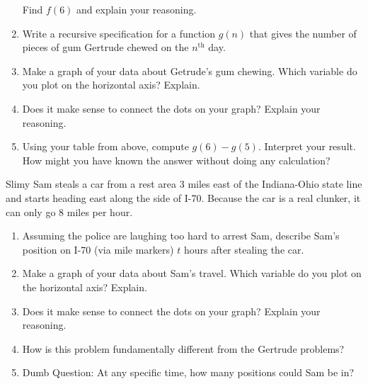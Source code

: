 \begin{prob}
\begin{enumerate}
Find $f(6)$ and explain your reasoning.  

\item Write a recursive specification for a function $g(n)$ that gives the number of pieces of gum Gertrude chewed on the $n^\mathrm{th}$ day.  

\item Make a graph of your data about Getrude's gum chewing.  Which variable do you plot on the horizontal axis?  Explain.  
\item Does it make sense to connect the dots on your graph?  Explain your reasoning.  
\item  Using your table from above, compute $g(6) - g(5)$.  Interpret your result.  How might you have known the answer without doing any calculation?  
\end{enumerate}
\end{prob}

\begin{prob}
Slimy Sam steals a car from a rest area 3 miles east of the Indiana-Ohio state line and starts heading east along the side of I-70.  Because the car is a real clunker, it can only go 8 miles per hour.  
\begin{enumerate}
\item Assuming the police are laughing too hard to arrest Sam, describe Sam's position on I-70 (via mile markers) $t$ hours after stealing the car.  
\item Make a graph of your data about Sam's travel.  Which variable do you plot on the horizontal axis?  Explain.  
\item Does it make sense to connect the dots on your graph?  Explain your reasoning.  
\item How is this problem fundamentally different from the Gertrude problems?  
\item Dumb Question:  At any specific time, how many positions could Sam be in? 
\end{enumerate}
\end{prob}
